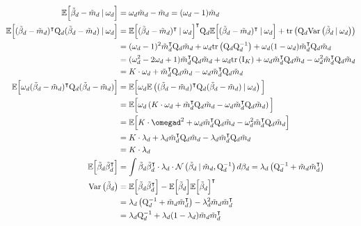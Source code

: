 \documentclass[twoside,11pt]{article}
\newcommand\given[1][]{\:#1\vert\:}
\newcommand{\transpose}[1]{#1^{\intercal}}
\newcommand{\E}{\mathbb{E}}
\newcommand{\betad}{\tilde{\beta}_d}
\newcommand{\qmat}{\mathrm{Q}}
\newcommand{\qbeta}{\mathcal{N} \left( \betad \given \tilde{m}_d, \qmat_d^{-1} \right)}
\newcommand{\trace}[1]{\mathrm{tr} \left( #1 \right)}
\newcommand{\var}[1]{\mathrm{Var}\left(#1\right)}
\begin{document}
\begin{align*}
	\E\Big[ \betad - \tilde{m}_d \given \omega_d \Big] &= \omega_d \tilde{m}_d - \tilde{m}_d = (\omega_d - 1) \tilde{m}_d \\
	\E \Big[ \transpose{(\betad - \tilde{m}_d)} \qmat_{d}(\betad - \tilde{m}_d) \given \omega_d \Big] &= \transpose{\E \Big[ \transpose{(\betad - \tilde{m}_d)} \given \omega_d \Big]} \qmat_d \E \Big[ \transpose{(\betad - \tilde{m}_d)} \given \omega_d \Big] + \trace{\qmat_d \var{\betad \given \omega_d}} \\
	&= (\omega_d-1)^2 \transpose{\tilde{m}_d} \qmat_d \tilde{m}_d + \omega_d \trace{\qmat_d \qmat_d^{-1}} + \omega_d(1-\omega_d)\transpose{\tilde{m}_d}\qmat_d \tilde{m}_d \\
	&= (\omega_d^2 - 2\omega_d + 1)\transpose{\tilde{m}_d} \qmat_d \tilde{m}_d + \omega_d \trace{\mathrm{I}_K} + \omega_d\transpose{\tilde{m}_d}\qmat_d \tilde{m}_d -\omega_d^2\transpose{\tilde{m}_d}\qmat_d \tilde{m}_d \\
	&= K \cdot \omega_d + \transpose{\tilde{m}_d}\qmat_d \tilde{m}_d - \omega_d \transpose{\tilde{m}_d}\qmat_d \tilde{m}_d \\
	\E \Big[ \omega_d \transpose{(\betad - \tilde{m}_d)} \qmat_{d}(\betad - \tilde{m}_d) \Big] &= \E \Big[ \omega_d \E \left(\transpose{(\betad - \tilde{m}_d)} \qmat_{d}(\betad - \tilde{m}_d) \given \omega_d \right) \Big]\\
	&= \E \Big[ \omega_d \left( K \cdot \omega_d + \transpose{\tilde{m}_d}\qmat_d \tilde{m}_d - \omega_d \transpose{\tilde{m}_d}\qmat_d \tilde{m}_d\right) \Big] \\
	&= \E \Big[ K \cdot \omegad^2 + \omega_d \transpose{\tilde{m}_d}\qmat_d \tilde{m}_d - \omega_d^2 \transpose{\tilde{m}_d}\qmat_d \tilde{m}_d \Big] \\
	&= K \cdot \lambda_d + \lambda_d \transpose{\tilde{m}_d}\qmat_d \tilde{m}_d - \lambda_d \transpose{\tilde{m}_d}\qmat_d \tilde{m}_d \\
	&= K \cdot \lambda_d \\
	\E \Big[ \betad \transpose{\betad} \Big] &= \int \betad \transpose{\betad} \cdot  \lambda_d \cdot 
\qbeta d\beta_d = \lambda_d \left( \qmat_d^{-1} + \tilde{m}_d \transpose{\tilde{m}_d} \right) \\
	\var{\betad} &= \E \Big[ \betad \transpose{\betad} \Big] - \E \Big[ \betad\Big] \transpose{\E \Big[ \betad\Big]} \\
	&= \lambda_d \left( \qmat_d^{-1} + \tilde{m}_d \transpose{\tilde{m}_d} \right) - \lambda_d^2 \tilde{m}_d \transpose{\tilde{m}_d} \\
	&= \lambda_d \qmat_d^{-1} + \lambda_d(1 - \lambda_d) \tilde{m}_d \transpose{\tilde{m}_d}
\end{align*}
\end{document}
